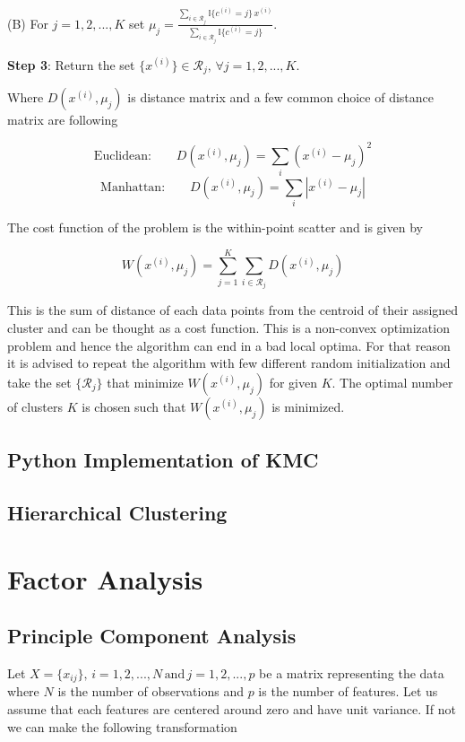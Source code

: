 \documentclass[11pt]{article}
\theoremstyle{definition}
\begin{document}
\quad		(B) For $j = 1, 2, ..., K$ set $\mu_j = \frac{\sum_{i\in \mathcal{R}_j} \mathbb{I}\{c^{(i)}=j\} \, x^{(i)}}{\sum_{i\in \mathcal{R}_j} \mathbb{I}\{c^{(i)}=j\}}$. 

{\bf{Step 3}}: Return the set $\{x^{(i)}\}\in \mathcal{R}_j,  \, \forall j = 1, 2, ..., K$. 



Where $D(x^{(i)}, \mu_j)$ is distance matrix and a few common choice of distance matrix are following 

$$
\text{Euclidean:} \qquad D(x^{(i)}, \mu_j) = \sum_i (x^{(i)} - \mu_j)^2 
$$
$$
\text{Manhattan:} \qquad D(x^{(i)}, \mu_j) = \sum_i |x^{(i)} - \mu_j|
$$


 The cost function of the problem is the within-point scatter and is given by 
 
$$
W(x^{(i)}, \mu_j) = \sum_{j=1}^K \sum_{i\in \mathcal{R}_j}  D(x^{(i)}, \mu_j)
$$


This is the sum of distance of each data points from the centroid of their assigned cluster and can be thought as a cost function. This is a non-convex optimization problem and hence the algorithm can end in a bad local optima. For that reason it is advised to repeat the algorithm with few different random initialization and take the set $\{\mathcal{R}_j\}$ that minimize $W(x^{(i)}, \mu_j)$ for given $K$. The optimal number of clusters $K$ is chosen such that $W(x^{(i)}, \mu_j) $ is minimized. 

\subsection{Python Implementation of KMC}

\subsection{Hierarchical Clustering }


\newpage
\section{Factor Analysis}

\subsection{Principle Component Analysis }

Let $X = \{x_{ij}\}, \, i = 1, 2, ..., N \, \text{and}\, j = 1, 2, ..., p $ be a matrix representing the data where $N$ is the number of observations and $p$ is the number of features. Let us assume that each features are centered around zero and have unit variance. If not we can make the following transformation 
\end{document}
